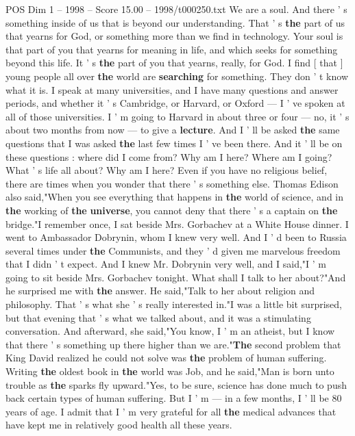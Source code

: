 \begin{textsample}{POS Dim 1 – 1998 – Score 15.00 – 1998/t000250.txt}
We are a soul.
And there ' s something inside of us that is beyond our understanding.
That ' s \textbf{the} part of us that yearns for God, or something more than we find in technology.
Your soul is that part of you that yearns for meaning in life, and which seeks for something beyond this life.
It ' s \textbf{the} part of you that yearns, really, for God.
I find [ that ] young people all over \textbf{the} world are \textbf{searching} for something.
They don ' t know what it is.
I speak at many universities, and I have many questions and answer periods, and whether it ' s Cambridge, or Harvard, or Oxford — I ' ve spoken at all of those universities.
I ' m going to Harvard in about three or four — no, it ' s about two months from now — to give a \textbf{lecture}.
And I ' ll be asked \textbf{the} same questions that I was asked \textbf{the} last few times I ' ve been there.
And it ' ll be on these questions : where did I come from?
Why am I here?
Where am I going?
What ' s life all about?
Why am I here?
Even if you have no religious belief, there are times when you wonder that there ' s something else.
Thomas Edison also said,"When you see everything that happens in \textbf{the} world of science, and in \textbf{the} working of \textbf{the} \textbf{universe}, you cannot deny that there ' s a captain on \textbf{the} bridge."I remember once, I sat beside Mrs.
Gorbachev at a White House dinner.
I went to Ambassador Dobrynin, whom I knew very well.
And I ' d been to Russia several times under \textbf{the} Communists, and they ' d given me marvelous freedom that I didn ' t expect.
And I knew Mr.
Dobrynin very well, and I said,"I ' m going to sit beside Mrs.
Gorbachev tonight.
What shall I talk to her about?"And he surprised me with \textbf{the} answer.
He said,"Talk to her about religion and philosophy.
That ' s what she ' s really interested in."I was a little bit surprised, but that evening that ' s what we talked about, and it was a stimulating conversation.
And afterward, she said,"You know, I ' m an atheist, but I know that there ' s something up there higher than we are."\textbf{The} second problem that King David realized he could not solve was \textbf{the} problem of human suffering.
Writing \textbf{the} oldest book in \textbf{the} world was Job, and he said,"Man is born unto trouble as \textbf{the} sparks fly upward."Yes, to be sure, science has done much to push back certain types of human suffering.
But I ' m — in a few months, I ' ll be 80 years of age.
I admit that I ' m very grateful for all \textbf{the} medical advances that have kept me in relatively good health all these years.

\end{textsample}
